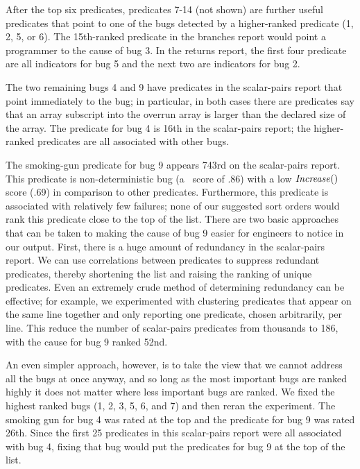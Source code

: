 After the top six predicates, predicates 7-14 (not shown) are further useful predicates that
point to one of the bugs detected by a higher-ranked predicate (1, 2, 5, or 6).  The 15th-ranked
predicate in the branches report would point a programmer to the cause of bug 3.  In the returns report,
the first four predicate are all indicators for bug 5 and the next two are indicators for bug 2.

The two remaining bugs 4 and 9 have predicates in the scalar-pairs report that point immediately to the
bug; in particular, in both cases there are predicates say that an array subscript into the overrun
array is larger than the declared size of the array.  The predicate for bug 4 is 16th
in the scalar-pairs report; the higher-ranked predicates are all associated with other bugs.  

The smoking-gun predicate
for bug 9 appears 743rd on the scalar-pairs report.  This predicate is non-deterministic bug (a \crash\ score of .86) with a 
low $\mbox{\textit{Increase}}()$ score (.69) in comparison to other predicates.  Furthermore, this predicate
 is associated with relatively few failures; none of our suggested sort
orders would rank this predicate close to the top of the list.  There are two basic approaches that can be taken
to making the cause of bug 9 easier for engineers to notice in our output.  First, there is
a huge amount of redundancy in the scalar-pairs report.  We can use correlations between predicates to suppress redundant
predicates, thereby shortening the list and raising the ranking of unique predicates.  Even an extremely crude method
of determining redundancy can be effective; for example, we experimented with clustering predicates that appear on the
same line together and only reporting one predicate, chosen arbitrarily, per line.  This reduce the number of scalar-pairs
predicates from thousands to 186, with the cause for bug 9 ranked 52nd.  

An even simpler approach, however, is to take the view that we cannot address all the bugs at once anyway, and so long
as the most important bugs are ranked highly it does not matter where less important bugs are ranked.  
We fixed the highest ranked bugs (1, 2, 3, 5, 6, and 7) and then reran the experiment.  The smoking gun for bug 4 was
rated at the top and the predicate for bug 9 was rated 26th.  Since the first 25 predicates in this scalar-pairs report
were all associated with bug 4, fixing that bug would put the predicates for bug 9 at the top of the list.


